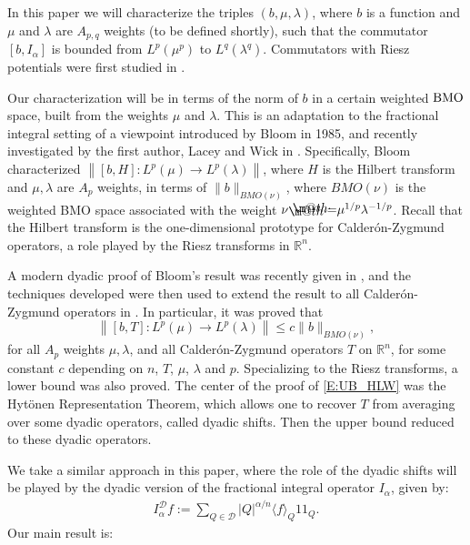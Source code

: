 \documentclass[12pt]{amsart}
\begin{document}
In this paper we will characterize the triples
$(b,\mu,\lambda)$, where $b$ is a function and $\mu$ and $\lambda$
are $A_{p,q}$ weights (to be defined shortly),
such that the commutator $[b,I_{\alpha}]$ is bounded from 
$L^p(\mu^p)$ to $L^q(\lambda^q)$.  Commutators with Riesz potentials were first studied in \cite{Chan1982}.

Our characterization will be in terms of
the norm of $b$ in a certain weighted ${\textnormal{BMO}}$ space, built
from the weights $\mu$ and $\lambda$. This is an adaptation to the fractional integral setting of a viewpoint
introduced by Bloom \cite{Blo1985} in 1985, and recently investigated
by the first author, Lacey and Wick in \cites{HolLacWic2015a,
HolLacWic2015b}. 
Specifically, Bloom characterized ${\ensuremath{\left\|{[b, H] : L^p(\mu) \rightarrow L^p({\lambda})}\right\|}}$, where $H$ is the Hilbert transform and $\mu, {\lambda}$ are $A_p$ weights,
in terms of $\|b\|_{BMO(\nu)}$, where $BMO(\nu)$ is the weighted BMO space associated with the weight $\nu {\mathrel{\rlap{                     \raisebox{0.3ex}{$\m@th\cdot$}}                     \raisebox{-0.3ex}{$\m@th\cdot$}}                     =} \mu^{1/p}{\lambda}^{-1/p}$. Recall that the 
Hilbert transform is the one-dimensional prototype for Calder{\'o}n-Zygmund operators, a role played by the Riesz transforms in $\mathbb{R}^n$. 

A modern 
dyadic proof of Bloom's result was recently given in \cite{HolLacWic2015a}, and the techniques developed were then used to extend the result to
all Calder{\'o}n-Zygmund operators in \cite{HolLacWic2015b}. In particular, it was proved that 
	\begin{equation} \label{E:UB_HLW}
	\left\| [b, T] : L^p(\mu) \rightarrow L^p({\lambda}) \right\| \leq c \|b\|_{BMO(\nu)},
	\end{equation}
for all $A_p$ weights $\mu, {\lambda}$, and all Calder{\'o}n-Zygmund operators $T$ on $\mathbb{R}^n$, for some constant $c$ depending on $n$, $T$, $\mu$, ${\lambda}$ and $p$. Specializing to the Riesz transforms, a lower bound was also proved.
The center of the proof of \eqref{E:UB_HLW} was the Hyt{\"o}nen Representation Theorem, which allows one to recover $T$ from averaging over some dyadic operators, called dyadic shifts. Then the upper bound reduced to these dyadic operators. 

We take a similar approach in this paper, where the role of the dyadic shifts will be played by the dyadic version of the fractional integral operator $I_{\alpha}$, given by:
\begin{align}\label{D:dfo}
I_{\alpha}^{{\mathcal{{D}}}}f:= 
  \sum_{Q\in{\mathcal{{D}}}}{\ensuremath{\left\vert{Q}\right\vert}}^{\alpha/n}{\langle } f{\rangle }_Q {1\!\!1}_Q.
\end{align}
Our main result is:
\end{document}
